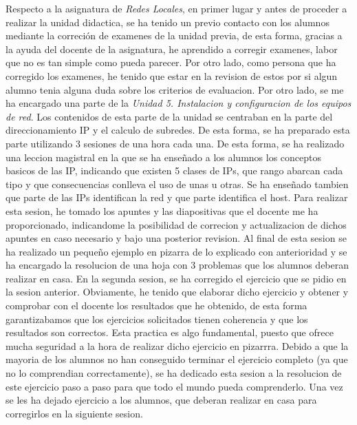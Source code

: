\documentclass[spanish,12pt, a4paper,twoside]{paper}
\begin{document}
\justify
Respecto a la asignatura de \textit{Redes Locales}, en primer lugar y antes de proceder a realizar la unidad didactica, se ha tenido un previo contacto con los alumnos mediante la correción de examenes de la unidad previa, de esta forma, gracias a la ayuda del docente de la asignatura, he aprendido a corregir examenes, labor que no es tan simple como pueda parecer. Por otro lado, como persona que ha corregido los examenes, he tenido que estar en la revision de estos por si algun alumno tenia alguna duda sobre los criterios de evaluacion.
\justify
Por otro lado, se me ha encargado una parte de la \textit{Unidad 5. Instalacion y configuracion de los equipos de red}. Los contenidos de esta parte de la unidad se centraban en la parte del direccionamiento IP y el calculo de subredes. De esta forma, se ha preparado esta parte utilizando 3 sesiones de una hora cada una. De esta forma, se ha realizado una leccion magistral en la que se ha enseñado a los alumnos los conceptos basicos de las IP, indicando que existen 5 clases de IPs, que rango abarcan cada tipo y que consecuencias conlleva el uso de unas u otras. Se ha enseñado tambien que parte de las IPs identifican la red y que parte identifica el host. Para realizar esta sesion, he tomado los apuntes y las diapositivas que el docente me ha proporcionado, indicandome la posibilidad de correcion y actualizacion de dichos apuntes en caso necesario y bajo una posterior revision. Al final de esta sesion se ha realizado un pequeño ejemplo en pizarra de lo explicado con anterioridad y se ha encargado la resolucion de una hoja con 3 problemas que los alumnos deberan realizar en casa.
\justify
En la segunda sesion, se ha corregido el ejercicio que se pidio en la sesion anterior. Obviamente, he tenido que elaborar dicho ejercicio y obtener y comprobar con el docente los resultados que he obtenido, de esta forma garantizabamos que los ejercicios solicitados tienen coherencia y que los resultados son correctos. Esta practica es algo fundamental, puesto que ofrece mucha seguridad a la hora de realizar dicho ejercicio en pizarrra. Debido a que la mayoria de los alumnos no han conseguido terminar el ejercicio completo (ya que no lo comprendian correctamente), se ha dedicado esta sesion a la resolucion de este ejercicio paso a paso para que todo el mundo pueda comprenderlo. Una vez se les ha dejado ejercicio a los alumnos, que deberan realizar en casa para corregirlos en la siguiente sesion.
\justify
\end{document}
